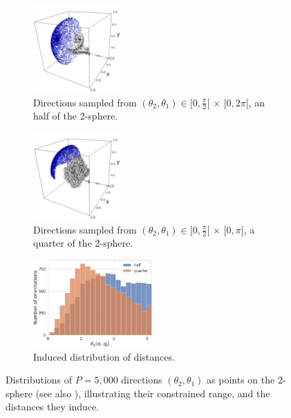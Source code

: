 \begin{figure}[ht!]
    \centering
    \begin{subfigure}[t]{0.32\linewidth}
        \centering
        \includegraphics[height=9em]{figures/5j0n-cvg.pdf}
        \caption{Directions sampled from $(\theta_2, \theta_1) \in [0,\frac{\pi}{2}[ \, \times \, [0,2\pi[$, an half of the 2-sphere.}
    \end{subfigure}
    \hfill
    \begin{subfigure}[t]{0.32\linewidth}
        \centering
        \includegraphics[height=9em]{figures/5a1a-cvg.pdf}
        \caption{Directions sampled from $(\theta_2, \theta_1) \in [0,\frac{\pi}{2}[ \, \times \, [0,\pi[$, a quarter of the 2-sphere.}
    \end{subfigure}
    \hfill
    \begin{subfigure}[t]{0.32\linewidth}
        \centering
        \includegraphics[height=9em]{figures/dQ_half_vs_quarter.pdf}
        \caption{Induced distribution of distances.}%
        \label{fig:orientation-constraints:distances}
    \end{subfigure}
    \caption{%
        Distributions of $P=5,000$ directions $(\theta_2, \theta_1)$ as points on the 2-sphere (see also ), illustrating their constrained range, and the distances they induce.
    }\label{fig:orientation-constraints}
\end{figure}

